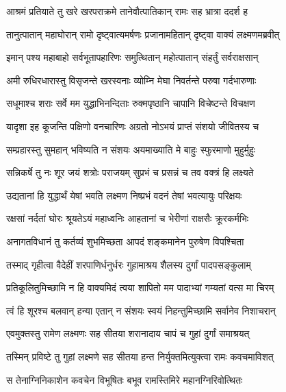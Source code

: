 
\twolineshloka
{आश्रमं प्रतियाते तु खरे खरपराक्रमे}
{तानेवौत्पातिकान् रामः सह भ्रात्रा ददर्श ह} %

\twolineshloka
{तानुत्पातान् महाघोरान् रामो दृष्ट्वात्यमर्षणः}
{प्रजानामहितान् दृष्ट्वा वाक्यं लक्ष्मणमब्रवीत्} %

\twolineshloka
{इमान् पश्य महाबाहो सर्वभूतापहारिणः}
{समुत्थितान् महोत्पातान् संहर्तुं सर्वराक्षसान्} %

\twolineshloka
{अमी रुधिरधारास्तु विसृजन्ते खरस्वनाः}
{व्योम्नि मेघा निवर्तन्ते परुषा गर्दभारुणाः} %

\twolineshloka
{सधूमाश्च शराः सर्वे मम युद्धाभिनन्दिताः}
{रुक्मपृष्ठानि चापानि विचेष्टन्ते विचक्षण} %

\twolineshloka
{यादृशा इह कूजन्ति पक्षिणो वनचारिणः}
{अग्रतो नोऽभयं प्राप्तं संशयो जीवितस्य च} %

\twolineshloka
{सम्प्रहारस्तु सुमहान् भविष्यति न संशयः}
{अयमाख्याति मे बाहुः स्फुरमाणो मुहुर्मुहुः} %

\twolineshloka
{सन्निकर्षे तु नः शूर जयं शत्रोः पराजयम्}
{सुप्रभं च प्रसन्नं च तव वक्त्रं हि लक्ष्यते} %

\twolineshloka
{उद्यतानां हि युद्धार्थं येषां भवति लक्ष्मण}
{निष्प्रभं वदनं तेषां भवत्यायुः परिक्षयः} %

\twolineshloka
{रक्षसां नर्दतां घोरः श्रूयतेऽयं महाध्वनिः}
{आहतानां च भेरीणां राक्षसैः क्रूरकर्मभिः} %

\twolineshloka
{अनागतविधानं तु कर्तव्यं शुभमिच्छता}
{आपदं शङ्कमानेन पुरुषेण विपश्चिता} %

\twolineshloka
{तस्माद् गृहीत्वा वैदेहीं शरपाणिर्धनुर्धरः}
{गुहामाश्रय शैलस्य दुर्गां पादपसङ्कुलाम्} %

\twolineshloka
{प्रतिकूलितुमिच्छामि न हि वाक्यमिदं त्वया}
{शापितो मम पादाभ्यां गम्यतां वत्स मा चिरम्} %

\twolineshloka
{त्वं हि शूरश्च बलवान् हन्या एतान् न संशयः}
{स्वयं निहन्तुमिच्छामि सर्वानेव निशाचरान्} %

\twolineshloka
{एवमुक्तस्तु रामेण लक्ष्मणः सह सीतया}
{शरानादाय चापं च गुहां दुर्गां समाश्रयत्} %

\twolineshloka
{तस्मिन् प्रविष्टे तु गुहां लक्ष्मणे सह सीतया}
{हन्त निर्युक्तमित्युक्त्वा रामः कवचमाविशत्} %

\twolineshloka
{स तेनाग्निनिकाशेन कवचेन विभूषितः}
{बभूव रामस्तिमिरे महानग्निरिवोत्थितः} %

